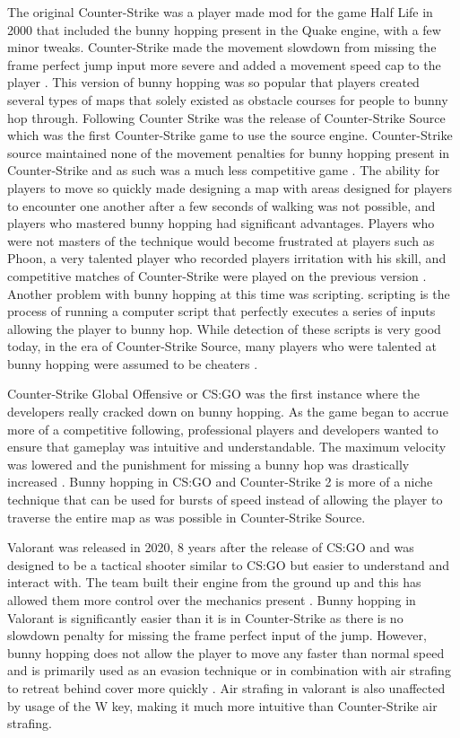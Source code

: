 \documentclass[10pt,twocolumn]{article}
\begin{document}
The original Counter-Strike was a player made mod for the game Half Life in 2000 that included the bunny hopping present in the Quake engine, with a few minor tweaks. Counter-Strike made the movement slowdown from missing the frame perfect jump input more severe and added a movement speed cap to the player \cite{bhopHistory}. This version of bunny hopping was so popular that players created several types of maps that solely existed as obstacle courses for people to bunny hop through. Following Counter Strike was the release of Counter-Strike Source which was the first Counter-Strike game to use the source engine\cite{bhopHistory}. Counter-Strike source maintained none of the movement penalties for bunny hopping present in Counter-Strike and as such was a much less competitive game \cite{ExploringEsports}. The ability for players to move so quickly made designing a map with areas designed for players to encounter one another after a few seconds of walking was not possible, and players who mastered bunny hopping had significant advantages. Players who were not masters of the technique would become frustrated at players such as Phoon, a very talented player who recorded players irritation with his skill, and competitive matches of Counter-Strike were played on the previous version \cite{phoon}. Another problem with bunny hopping at this time was scripting. scripting is the process of running a computer script that perfectly executes a series of inputs allowing the player to bunny hop. While detection of these scripts is very good today, in the era of Counter-Strike Source, many players who were talented at bunny hopping were assumed to be cheaters \cite{bhopHistory}. 

Counter-Strike Global Offensive or CS:GO was the first instance where the developers really cracked down on bunny hopping. As the game began to accrue more of a competitive following, professional players and developers wanted to ensure that gameplay was intuitive and understandable. The maximum velocity was lowered and the punishment for missing a bunny hop was drastically increased \cite{HowToBhopCS2}. Bunny hopping in CS:GO and Counter-Strike 2 is more of a niche technique that can be used for bursts of speed instead of allowing the player to traverse the entire map as was possible in Counter-Strike Source.

Valorant was released in 2020, 8 years after the release of CS:GO and was designed to be a tactical shooter similar to CS:GO but easier to understand and interact with. The team built their engine from the ground up and this has allowed them more control over the mechanics present \cite{devDiaries}. Bunny hopping in Valorant is significantly easier than it is in Counter-Strike as there is no slowdown penalty for missing the frame perfect input of the jump. However, bunny hopping does not allow the player to move any faster than normal speed and is primarily used as an evasion technique or in combination with air strafing to retreat behind cover more quickly \cite{BhopTutorialValorant}. Air strafing in valorant is also unaffected by usage of the W key, making it much more intuitive than Counter-Strike air strafing.
\end{document}
